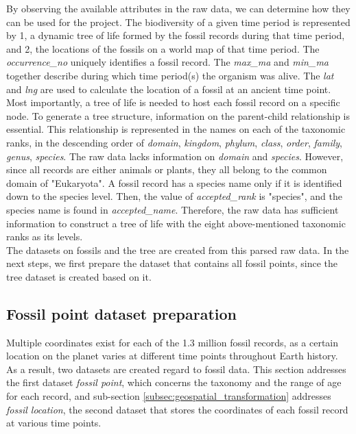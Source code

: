 \documentclass[11pt, a4paper,oneside,chapterprefix=false]{scrbook}
\begin{document}
By observing the available attributes in the raw data, we can determine how they can be used for the project. The biodiversity of a given time period is represented by 1, a dynamic tree of life formed by the fossil records during that time period, and 2, the locations of the fossils on a world map of that time period. The \emph{occurrence\_no} uniquely identifies a fossil record. The \emph{max\_ma} and \emph{min\_ma} together describe during which time period(s) the organism was alive. The \emph{lat} and \emph{lng} are used to calculate the location of a fossil at an ancient time point. Most importantly, a tree of life is needed to host each fossil record on a specific node. To generate a tree structure, information on the parent-child relationship is essential. This relationship is represented in the names on each of the taxonomic ranks, in the descending order of \emph{domain}, \emph{kingdom}, \emph{phylum}, \emph{class}, \emph{order}, \emph{family}, \emph{genus}, \emph{species}. The raw data lacks information on \emph{domain} and \emph{species}. However, since all records are either animals or plants, they all belong to the common domain of "Eukaryota". A fossil record has a species name only if it is identified down to the species level. Then, the value of \emph{accepted\_rank} is "species", and the species name is found in \emph{accepted\_name}. Therefore, the raw data has sufficient information to construct a tree of life with the eight above-mentioned taxonomic ranks as its levels.\\

The datasets on fossils and the tree are created from this parsed raw data. In the next steps, we first prepare the dataset that contains all fossil points, since the tree dataset is created based on it. 

\subsection{Fossil point dataset preparation}
\label{subsec:fossil_preparation}
Multiple coordinates exist for each of the 1.3 million fossil records, as a certain location on the planet varies at different time points throughout Earth history. As a result, two datasets are created regard to fossil data. This section addresses the first dataset \emph{fossil point}, which concerns the taxonomy and the range of age for each record, and sub-section \ref{subsec:geospatial_transformation} addresses \emph{fossil location}, the second dataset that stores the coordinates of each fossil record at various time points. \\
\end{document}
